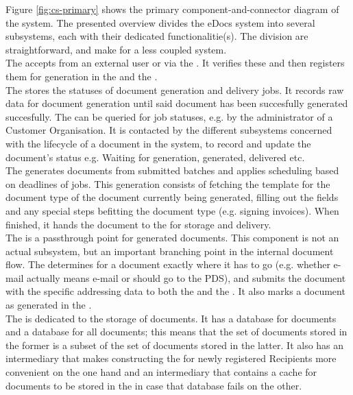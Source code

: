 Figure \ref{fig:cs-primary} shows the primary component-and-connector diagram of the system. The presented overview divides the eDocs system into several subsystems, each with their dedicated functionalitie(s). The division are straightforward, and make for a less coupled system.\\
The  accepts  from an external user or via the . It verifies these  and then registers them for generation in the  and the .\\
The  stores the statuses of document generation and delivery jobs. It records raw data for document generation until said document has been succesfully generated succesfully. The  can be queried for job statuses, e.g. by the administrator of a Customer Organisation. It is contacted by the different subsystems concerned with the lifecycle of a document in the system, to record and update the document's status e.g. Waiting for generation, generated, delivered etc.\\
The  generates documents from submitted batches and applies scheduling based on deadlines of jobs. This generation consists of fetching the template for the document type of the document currently being generated, filling out the fields and any special steps befitting the document type (e.g. signing invoices). When finished, it hands the document to the  for storage and delivery.\\
The  is a passthrough point for generated documents. This component is not an actual subsystem, but an important branching point in the internal document flow. The  determines for a document exactly where it has to go (e.g. whether e-mail actually means e-mail or should go to the PDS), and submits the document with the specific addressing data to both the  and the . It also marks a document as generated in the .\\
The  is dedicated to the storage of documents. It has a database for  documents and a database for all documents; this means that the set of documents stored in the former is a subset of the set of documents stored in the latter. It also has an intermediary that makes constructing the  for newly registered Recipients more convenient on the one hand and an intermediary that contains a cache for documents to be stored in the  in case that database fails on the other.\\
